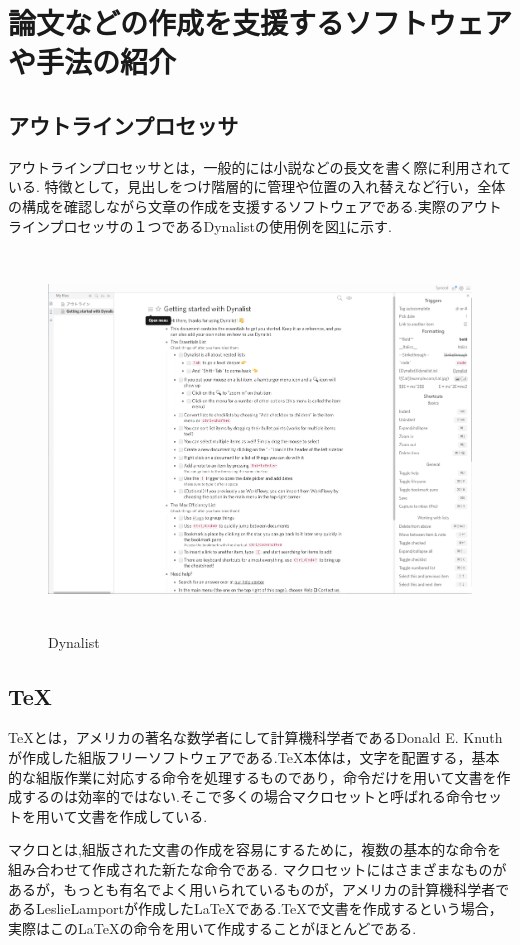\documentclass[a4j,12pt]{jarticle}
\begin{document}
\newpage
\section{論文などの作成を支援するソフトウェアや手法の紹介}
\subsection{アウトラインプロセッサ}
アウトラインプロセッサとは，一般的には小説などの長文を書く際に利用されている.
特徴として，見出しをつけ階層的に管理や位置の入れ替えなど行い，全体の構成を確認しながら文章の作成を支援するソフトウェアである.実際のアウトラインプロセッサの１つであるDynalistの使用例を図\ref{fig:b}に示す.
\begin{figure}[H]
\begin{center}
 \includegraphics[clip,width=150mm,height=100mm]{Dynalist.png}
 \end{center}
 \caption{Dynalist}
 \label{fig:b}
\end{figure}
\newpage
\subsection{\TeX}
\TeX とは，アメリカの著名な数学者にして計算機科学者であるDonald E. Knuthが作成した組版フリーソフトウェアである.TeX本体は，文字を配置する，基本的な組版作業に対応する命令を処理するものであり，命令だけを用いて文書を作成するのは効率的ではない.そこで多くの場合マクロセットと呼ばれる命令セットを用いて文書を作成している.

マクロとは,組版された文書の作成を容易にするために，複数の基本的な命令を組み合わせて作成された新たな命令である.
マクロセットにはさまざまなものがあるが，もっとも有名でよく用いられているものが，アメリカの計算機科学者であるLeslieLamportが作成した\LaTeX である.\TeX で文書を作成するという場合，実際はこのLaTeXの命令を用いて作成することがほとんどである.
\end{document}
